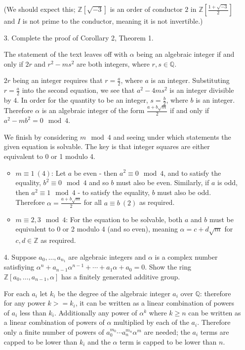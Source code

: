 \documentclass{article}
\newcommand{\modequiv}[3]{#1 \equiv #2\ (#3)}
\begin{document}
\begin{enumerate}
    (We should expect this; $\mathbb{Z}[\sqrt{-3}]$ is an order of conductor $2$ in $\mathbb{Z}[\frac{1 + \sqrt{-3}}{2}]$ and $I$ is not prime to the conductor, meaning it is not invertible.)

\item[3.]
    Complete the proof of Corollary 2, Theorem 1.

    The statement of the text leaves off with $\alpha$ being an algebraic integer if and only if $2r$ and $r^2 - ms^2$ are both integers, where $r, s \in \mathbb{Q}$.

    $2r$ being an integer requires that $r = \frac{a}{2}$, where $a$ is an integer.  Substituting $r = \frac{a}{2}$ into the second equation, we see that $a^2 - 4ms^2$ is an integer divisible by $4$.  In order for the quantity to be an integer, $s = \frac{b}{2}$, where $b$ is an integer.  Therefore $\alpha$ is an algebraic integer of the form $\frac{a + b\sqrt{m}}{2}$ if and only if $a^2 - mb^2 = 0 \mod 4$.

    We finish by considering $m \mod 4$ and seeing under which statements the given equation is solvable.  The key is that integer squares are either equivalent to 0 or 1 modulo 4.
    \begin{itemize}
        \item {\bf $\modequiv{m}{1}{4}$}:  Let $a$ be even - then $a^2 \equiv 0 \mod 4$, and to satisfy the equality, $b^2 \equiv 0 \mod 4$ and so $b$ must also be even.  Similarly, if $a$ is odd, then $a^2 \equiv 1 \mod 4$ - to satisfy the equality, $b$ must also be odd.  Therefore $\alpha = \frac{a + b\sqrt{m}}{2}$ for all $a \equiv b\ (2)$ as required.
        \item {\bf $m \equiv 2, 3 \mod 4$}: For the equation to be solvable, both $a$ and $b$ must be equivalent to 0 or 2 modulo 4 (and so even), meaning $\alpha = c + d\sqrt{m}$ for $c, d \in \mathbb{Z}$ as required.
    \end{itemize}

\item[4.]
    Suppose $a_0, \ldots, a_{n_1}$ are algebraic integers and $\alpha$ is a complex number satisfiying $\alpha^n + a_{n-1}\alpha^{n-1} + \cdots + a_1\alpha + a_0 = 0$.  Show the ring $\mathbb{Z}{[a_0, \ldots, a_{n-1}, \alpha]}$ has a finitely generated additive group.

    For each $a_i$ let $k_i$ be the degree of the algebraic integer $a_i$ over $\mathbb{Q}$: therefore for any power $k >= k_i$, it can be written as a linear combination of powers of $a_i$ less than $k_i$.  Additionally any power of $\alpha^k$ where $k \ge n$ can be written as a linear combination of powers of $\alpha$ multiplied by each of the $a_i$.  Therefore only a finite number of powers of $a_0^{m_0} \cdots a_n^{m_n} \alpha^{m}$ are needed; the $a_i$ terms are capped to be lower than $k_i$ and the $\alpha$ term is capped to be lower than $n$.


\end{enumerate}
\end{document}
